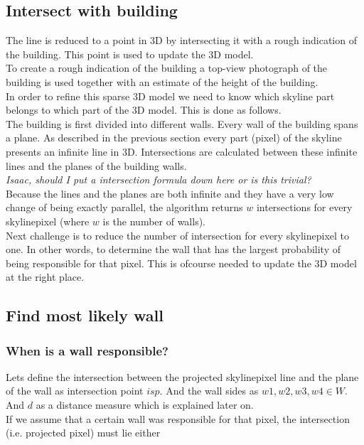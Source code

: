 \documentclass[10pt]{article}
\begin{document}
\subsection{Intersect with building}
The line is reduced to a point in 3D by intersecting it with a rough indication
of the building. This point is used to update the 3D model.\\
To create a rough indication of the building a top-view photograph of the
building is used together with an estimate of the height of the building.\\ 
In order to refine this sparse 3D model we need to know which skyline part belongs to which part of
the 3D model. This is done as follows.\\
The building is first divided into different walls.  Every wall of the building spans a plane. 
As described in the previous section every part (pixel) of the skyline presents an infinite line in 3D.
Intersections are calculated between these infinite lines and the planes of the building walls.\\
\textit{ Isaac, should I put a intersection formula down here or is this trivial?}\\
Because the lines and the planes are both infinite and they have a very low change
of being exactly parallel, the algorithm returns $w$ intersections for every
skylinepixel (where $w$ is the number of walls).\\
Next challenge is to reduce the number of intersection for every skylinepixel
to one. In other words, to determine the wall that has the largest probability of
being responsible for that pixel. This is ofcourse needed to update the 3D
model at the right place.

\subsection{Find most likely wall}
\subsubsection{When is a wall responsible?}
Lets define the intersection between the projected skylinepixel line and the
plane of the wall as intersection point $isp$. And the wall sides as ${w1, w2,
w3, w4 \in W}$. And $d$ as a distance measure which is explained later on.\\ If
we assume that a certain wall was responsible for that pixel, the intersection
(i.e. projected pixel) must lie either\\
\end{document}
